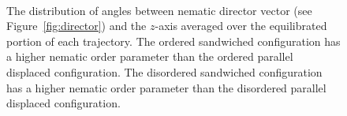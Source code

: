 \documentclass{article}
\begin{document}
\begin{figure}[!htb]
\begin{subfigure}{\linewidth}
\begin{subfigure}{0.45\linewidth}
        \end{subfigure}
  \end{subfigure}
  \caption{The distribution of angles between nematic director vector (see
	  Figure~\ref{fig:director}) and the $z$-axis averaged over the equilibrated portion
	  of each trajectory. The ordered sandwiched configuration has a higher nematic order
	  parameter than the ordered parallel displaced configuration. The disordered
	  sandwiched configuration has a higher nematic order parameter than the 
	  disordered parallel displaced configuration.}~\label{fig:nematic_distribution}
  \end{figure}

%  
%  
%  
%  
%  
\end{document}
